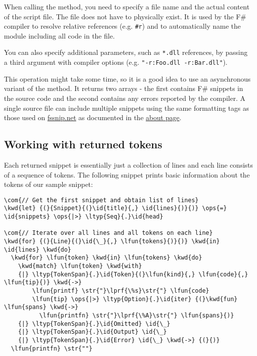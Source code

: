 \documentclass{article}
\newcommand{\id}[1]{\textcolor{black}{#1}}
\newcommand{\com}[1]{\textcolor{officegreen}{#1}}
\newcommand{\kwd}[1]{\textcolor{navy}{#1}}
\newcommand{\ops}[1]{\textcolor{purple}{#1}}
\newcommand{\str}[1]{\textcolor{olive}{#1}}
\begin{document}
When calling the method, you need to specify a file name and the actual content
of the script file. The file does not have to physically exist. It is used by the
F\# compiler to resolve relative references (e.g. \texttt{\#r}) and to automatically name
the module including all code in the file.


You can also specify additional parameters, such as \texttt{*.dll} references, by passing
a third argument with compiler options (e.g. \texttt{"-r:Foo.dll -r:Bar.dll"}).


This operation might take some time, so it is a good idea to use an asynchronous
variant of the method. It returns two arrays - the first contains F\# snippets
in the source code and the second contains any errors reported by the compiler.
A single source file can include multiple snippets using the same formatting tags
as those used on \href{http://www.fssnip.net}{fssnip.net} as documented in the
\href{http://www.fssnip.net/pages/About}{about page}.
\subsection*{Working with returned tokens}



Each returned snippet is essentially just a collection of lines and each line
consists of a sequence of tokens. The following snippet prints basic information
about the tokens of our sample snippet:
\begin{Verbatim}[commandchars=\\\{\}]
\com{// Get the first snippet and obtain list of lines}
\kwd{let} {(}{Snippet}{(}\id{title}{,} \id{lines}{)}{)} \ops{=} \id{snippets} \ops{|>} \ltyp{Seq}{.}\id{head}

\com{// Iterate over all lines and all tokens on each line}
\kwd{for} {(}{Line}{(}\id{\_}{,} \lfun{tokens}{)}{)} \kwd{in} \id{lines} \kwd{do}
  \kwd{for} \lfun{token} \kwd{in} \lfun{tokens} \kwd{do}
    \kwd{match} \lfun{token} \kwd{with}
    {|} \ltyp{TokenSpan}{.}\id{Token}{(}\lfun{kind}{,} \lfun{code}{,} \lfun{tip}{)} \kwd{->} 
        \lfun{printf} \str{"}\lprf{\%s}\str{"} \lfun{code}
        \lfun{tip} \ops{|>} \ltyp{Option}{.}\id{iter} {(}\kwd{fun} \lfun{spans} \kwd{->}
          \lfun{printfn} \str{"}\lprf{\%A}\str{"} \lfun{spans}{)}          
    {|} \ltyp{TokenSpan}{.}\id{Omitted} \id{\_} 
    {|} \ltyp{TokenSpan}{.}\id{Output} \id{\_} 
    {|} \ltyp{TokenSpan}{.}\id{Error} \id{\_} \kwd{->} {(}{)}
  \lfun{printfn} \str{""}
\end{Verbatim}
\end{document}
